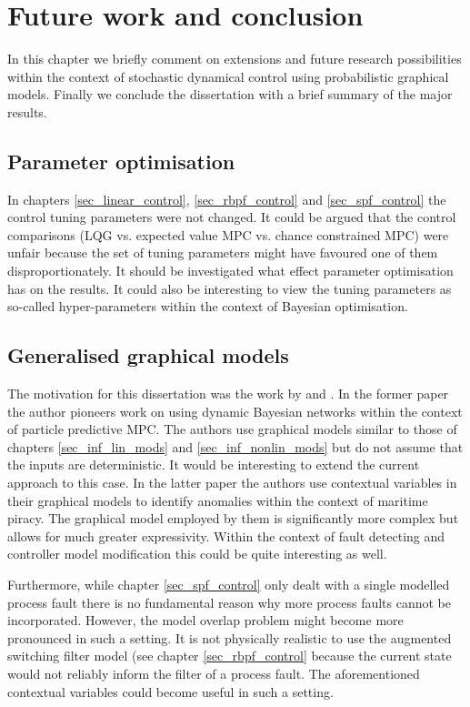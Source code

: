 \chapter{Future work and conclusion}
In this chapter we briefly comment on extensions and future research possibilities within the context of stochastic dynamical control using probabilistic graphical models. Finally we conclude the dissertation with a brief summary of the major results.

\section{Parameter optimisation}
In chapters \ref{sec_linear_control}, \ref{sec_rbpf_control} and \ref{sec_spf_control} the control tuning parameters were not changed. It could be argued that the control comparisons (LQG vs. expected value MPC vs. chance constrained MPC) were unfair because the set of tuning parameters might have favoured one of them disproportionately. It should be investigated what effect parameter optimisation has on the results. It could also be interesting to view the tuning parameters as so-called hyper-parameters within the context of Bayesian optimisation. 

\section{Generalised graphical models}
The motivation for this dissertation was the work by \cite{devilliers} and \cite{dabrowski}. In the former paper the author pioneers work on using dynamic Bayesian networks within the context of particle predictive MPC. The authors use graphical models similar to those of chapters \ref{sec_inf_lin_mods} and \ref{sec_inf_nonlin_mods} but do not assume that the inputs are deterministic. It would be interesting to extend the current approach to this case. In the latter paper the authors use contextual variables in their graphical models to identify anomalies within the context of maritime piracy. The graphical model employed by them is significantly more complex but allows for much greater expressivity. Within the context of fault detecting and controller model modification this could be quite interesting as well.

Furthermore, while chapter \ref{sec_spf_control} only dealt with a single modelled process fault there is no fundamental reason why more process faults cannot be incorporated. However, the model overlap problem might become more pronounced in such a setting. It is not physically realistic to use the augmented switching filter model (see chapter \ref{sec_rbpf_control} because the current state would not reliably inform the filter of a process fault. The aforementioned contextual variables could become useful in such a setting.

